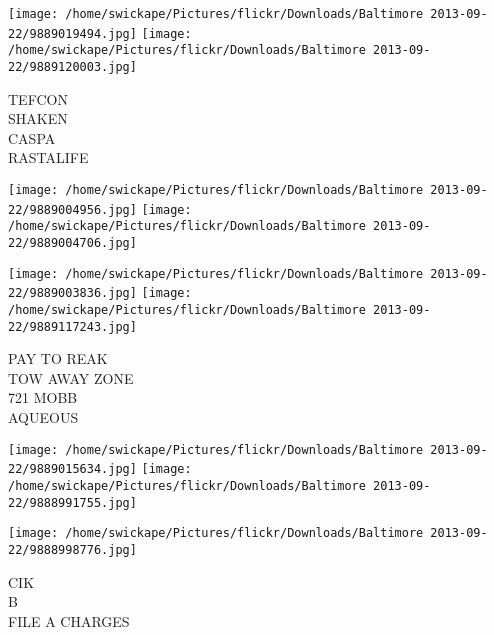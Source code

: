 \documentclass[10pt,letterpaper]{article}
\begin{document}
\texttt{[image: /home/swickape/Pictures/flickr/Downloads/Baltimore 2013-09-22/9889019494.jpg]}
\texttt{[image: /home/swickape/Pictures/flickr/Downloads/Baltimore 2013-09-22/9889120003.jpg]}

TEFCON\\
SHAKEN\\
CASPA\\
RASTALIFE\\
\pagebreak

\texttt{[image: /home/swickape/Pictures/flickr/Downloads/Baltimore 2013-09-22/9889004956.jpg]}
\texttt{[image: /home/swickape/Pictures/flickr/Downloads/Baltimore 2013-09-22/9889004706.jpg]}

\texttt{[image: /home/swickape/Pictures/flickr/Downloads/Baltimore 2013-09-22/9889003836.jpg]}
\texttt{[image: /home/swickape/Pictures/flickr/Downloads/Baltimore 2013-09-22/9889117243.jpg]}

PAY TO REAK\\
TOW AWAY ZONE\\
721 MOBB\\
AQUEOUS\\
\pagebreak

\texttt{[image: /home/swickape/Pictures/flickr/Downloads/Baltimore 2013-09-22/9889015634.jpg]}
\texttt{[image: /home/swickape/Pictures/flickr/Downloads/Baltimore 2013-09-22/9888991755.jpg]}

\vspace{0.25in}
\texttt{[image: /home/swickape/Pictures/flickr/Downloads/Baltimore 2013-09-22/9888998776.jpg]}

CIK\\
B\\
FILE A CHARGES\\
\pagebreak
\end{document}
